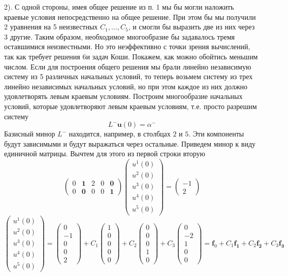 \documentclass[12pt]{article}
\renewcommand{\u}{\mathbf{u}}
\newcommand{\Lm}{L^{-}}
\newcommand{\am}{\alpha^{-}}
\begin{document}
2). С одной стороны, имея общее решение из п. 1 мы бы могли наложить краевые условия непосредственно на 
общее решение. При этом бы мы получили 2 уравнения на 5 неизвестных 
$C_1, \dots, C_5$, и смогли бы выразить две из них через 3 другие. Таким образом, необходимое многообразие 
бы задавалось тремя оставшимися неизвестными. Но это неэффективно с точки зрения вычислений, так как 
требует решения 6и задач Коши. Покажем, как можно обойтись меньшим числом. Если для построения общего решения мы 
брали линейно независимую систему из 5 различных начальных условий, то теперь возьмем систему из трех линейно 
независимых начальных условий, но при этом каждое из них должно удовлетворять левым краевым условиям. 
Построим многообразие начальных условий, которые удовлетворяют левым краевым условиям, т.е. просто разрешим систему
\[
\Lm \u(0) = \am
\]
Базисный минор $\Lm$ находится, например, в столбцах $2$ и $5$. Эти компоненты будут зависимыми и будут 
выражаться через остальные. Приведем минор к виду единичной матрицы. Вычтем для этого из первой строки вторую
\[
\begin{pmatrix}
0&\mathbf{1}&2&0&\mathbf{0}\\
0&\mathbf{0}&0&0&\mathbf{1}
\end{pmatrix}
\begin{pmatrix}
u^1(0)\\u^2(0)\\u^3(0)\\u^4(0)\\u^5(0)
\end{pmatrix}
= 
\begin{pmatrix}
-1\\2
\end{pmatrix}
\]
\[
\begin{pmatrix}
u^1(0)\\u^2(0)\\u^3(0)\\u^4(0)\\u^5(0)
\end{pmatrix}
= 
\begin{pmatrix}
0\\-1\\0\\0\\2
\end{pmatrix}
+C_1 \begin{pmatrix}
1\\0\\0\\0\\0
\end{pmatrix}
+C_2 \begin{pmatrix}
0\\0\\0\\1\\0
\end{pmatrix}
+C_3 \begin{pmatrix}
0\\-2\\1\\0\\0
\end{pmatrix}
= \mathbf{f}_0 + 
C_1 \mathbf{f_1} + 
C_2 \mathbf{f_2} + 
C_3 \mathbf{f_3}
\]
\end{document}
